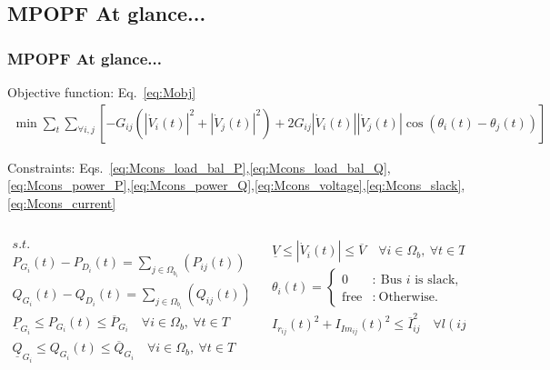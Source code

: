 \documentclass[
	11pt, %
	aspectratio=169, %
]{beamer}
\begin{document}

\subsection{MPOPF At glance...}

\begin{frame}
	\frametitle{MPOPF At glance...}
	\label{frame:MPOFP_atglance}
	
	Objective function: Eq.~\eqref{eq:Mobj}
	\begin{align*}
		\min{ \sum_{t} \sum_{\forall i,j} {[-G_{ij}(\left|\dot{V}_{i}(t) \right|^2 + \left|\dot{V}_{j}(t) \right|^2) + 2G_{ij}\left|\dot{V}_{i}(t) \right|\left|\dot{V}_{j}(t) \right|\cos\left(\theta_{i}(t)-\theta_{j}(t) \right) ]} }
	\end{align*}

	Constraints: Eqs.~\eqref{eq:Mcons_load_bal_P},\eqref{eq:Mcons_load_bal_Q},\eqref{eq:Mcons_power_P},\eqref{eq:Mcons_power_Q},\eqref{eq:Mcons_voltage},\eqref{eq:Mcons_slack},\eqref{eq:Mcons_current}
	\vspace{-1.2em}
	\begin{columns}
		\begin{column}{0.5\textwidth}
			\begin{align*}
				s.t. \quad \\
				P_{G_{i}}(t) - P_{D_{i}}(t) = \sum_{j \in \Omega_{b_{i}}}(P_{ij}(t))  \quad \forall i \in \Omega_{b},\ \forall t \in T\\
				Q_{G_{i}}(t) - Q_{D_{i}}(t) = \sum_{j \in \Omega_{b_{i}}}(Q_{ij}(t))  \quad \forall i \in \Omega_{b},\ \forall t \in T\\
				\underline{P}_{G_{i}} \leq P_{G_{i}}(t) \leq \overline{P}_{G_{i}} \quad \forall i \in \Omega_{b},\ \forall t \in T\\
				\underline{Q}_{G_{i}} \leq Q_{G_{i}}(t) \leq \overline{Q}_{G_{i}}  \quad \forall i \in \Omega_{b},\ \forall t \in T\\
			\end{align*}
		\end{column}

		\begin{column}{0.5\textwidth}
			\begin{align*}
				\underline{V} \leq \left|\dot{V}_{i}(t) \right| \leq \overline{V}  \quad \forall i \in \Omega_{b},\ \forall t \in T\\
				\theta_{i}(t) = \left\{ \begin{array}{cl}
							0 & : \ \text{Bus } i \text{ is slack,} \\
							\text{free} & : \ \text{Otherwise.}
							\end{array} \right.\\
				I_{r_{ij}}(t)^{2}+ I_{Im_{ij}}(t)^{2} \leq \overline{I}_{ij}^{2} \quad   \forall l(ij) \in \Omega_{l},\ \forall t \in T\\
			\end{align*}
		\end{column}
	\end{columns}
	
\end{frame}
\end{document}
